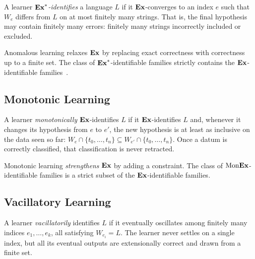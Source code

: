 \begin{defn}
\label{def:anomalous}
A learner \emph{$\mathbf{Ex}^*$-identifies} a language $L$ if it $\mathbf{Ex}$-converges to an index $e$ such that $W_e$ differs from $L$ on at most finitely many strings. That is, the final hypothesis may contain finitely many errors: finitely many strings incorrectly included or excluded.
\end{defn}

Anomalous learning relaxes $\mathbf{Ex}$ by replacing exact correctness with correctness up to a finite set. The class of $\mathbf{Ex}^*$-identifiable families strictly contains the $\mathbf{Ex}$-identifiable families~\cite{CaseSmith1983}.

\subsection{Monotonic Learning}
\label{sec:monotonic}

\begin{defn}
\label{def:monotonic}
A learner \emph{monotonically} $\mathbf{Ex}$-identifies $L$ if it $\mathbf{Ex}$-identifies $L$ and, whenever it changes its hypothesis from $e$ to $e'$, the new hypothesis is at least as inclusive on the data seen so far: $W_e \cap \{t_0, \ldots, t_n\} \subseteq W_{e'} \cap \{t_0, \ldots, t_n\}$. Once a datum is correctly classified, that classification is never retracted.
\end{defn}

Monotonic learning \emph{strengthens} $\mathbf{Ex}$ by adding a constraint. The class of $\mathrm{Mon}\mathbf{Ex}$-identifiable families is a strict subset of the $\mathbf{Ex}$-identifiable families.

\subsection{Vacillatory Learning}
\label{sec:vacillatory}

\begin{defn}
\label{def:vacillatory}
A learner \emph{vacillatorily} identifies $L$ if it eventually oscillates among finitely many indices $e_1, \ldots, e_k$, all satisfying $W_{e_i} = L$. The learner never settles on a single index, but all its eventual outputs are extensionally correct and drawn from a finite set.
\end{defn}

